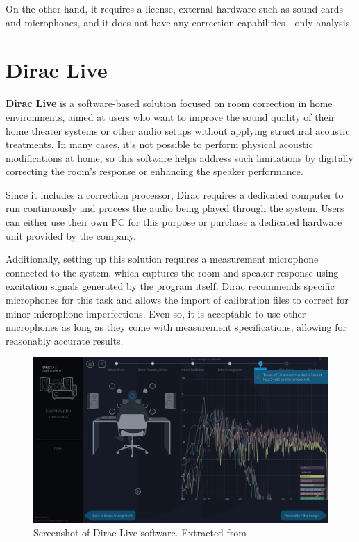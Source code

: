 On the other hand, it requires a license, external hardware such as sound cards and microphones, and it does not have any correction capabilities—only analysis.


\section{Dirac Live}

\textbf{Dirac Live} \cite{dirac_live} is a software-based solution focused on room correction in home environments, aimed at users who want to improve the sound quality of their home theater systems or other audio setups without applying structural acoustic treatments. In many cases, it's not possible to perform physical acoustic modifications at home, so this software helps address such limitations by digitally correcting the room’s response or enhancing the speaker performance.

Since it includes a correction processor, Dirac requires a dedicated computer to run continuously and process the audio being played through the system. Users can either use their own PC for this purpose or purchase a dedicated hardware unit provided by the company.

Additionally, setting up this solution requires a measurement microphone connected to the system, which captures the room and speaker response using excitation signals generated by the program itself. Dirac recommends specific microphones for this task and allows the import of calibration files to correct for minor microphone imperfections. Even so, it is acceptable to use other microphones as long as they come with measurement specifications, allowing for reasonably accurate results.

\begin{figure}[H]
	\centering
	\includegraphics[width=0.9
	\linewidth]{Figures/dirac.jpg}
	\caption[Screenshot of Dirac Live]{Screenshot of Dirac Live software. Extracted from \cite{dirac_image}}
	\label{fig:Dirac}
\end{figure}

